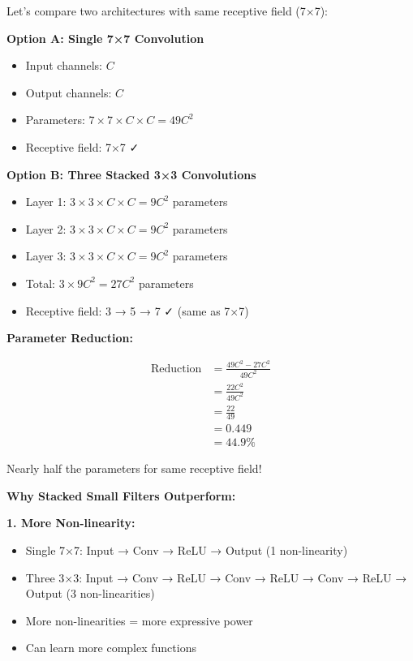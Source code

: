 \documentclass[12pt]{article}
\newcommand{\explanation}[1]{{\color{explanationcolor}#1}}
\begin{document}
\begin{enumerate}[(a)]
{    \explanation{
    Let's compare two architectures with same receptive field (7×7):
    
    \textbf{Option A: Single 7×7 Convolution}
    \begin{itemize}
        \item Input channels: $C$
        \item Output channels: $C$
        \item Parameters: $7 \times 7 \times C \times C = 49C^2$
        \item Receptive field: 7×7 ✓
    \end{itemize}
    
    \textbf{Option B: Three Stacked 3×3 Convolutions}
    \begin{itemize}
        \item Layer 1: $3 \times 3 \times C \times C = 9C^2$ parameters
        \item Layer 2: $3 \times 3 \times C \times C = 9C^2$ parameters
        \item Layer 3: $3 \times 3 \times C \times C = 9C^2$ parameters
        \item Total: $3 \times 9C^2 = 27C^2$ parameters
        \item Receptive field: 3 → 5 → 7 ✓ (same as 7×7)
    \end{itemize}
    }
    
    \textbf{Parameter Reduction:}
    
    \explanation{
    \begin{align}
    \text{Reduction} &= \frac{49C^2 - 27C^2}{49C^2}\\
    &= \frac{22C^2}{49C^2}\\
    &= \frac{22}{49}\\
    &= 0.449\\
    &= 44.9\%
    \end{align}
    
    Nearly half the parameters for same receptive field!
    }
    
    \textbf{Why Stacked Small Filters Outperform:}
    
    \explanation{
    \textbf{1. More Non-linearity:}
    \begin{itemize}
        \item Single 7×7: Input → Conv → ReLU → Output (1 non-linearity)
        \item Three 3×3: Input → Conv → ReLU → Conv → ReLU → Conv → ReLU → Output (3 non-linearities)
        \item More non-linearities = more expressive power
        \item Can learn more complex functions
    \end{itemize}
    
}}
\end{enumerate}
\end{document}
